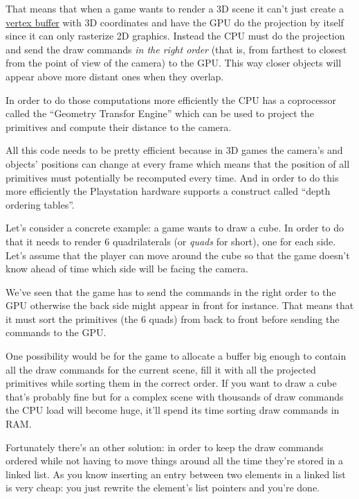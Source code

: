 \documentclass[a4paper]{article}
\begin{document}
That means that when a game wants to render a 3D scene it can't just
create a
\href{https://en.wikipedia.org/wiki/Vertex_Buffer_Object}{vertex
  buffer} with 3D coordinates and have the GPU do the projection by
itself since it can only rasterize 2D graphics. Instead the CPU must
do the projection and send the draw commands \emph{in the right order}
(that is, from farthest to closest from the point of view of the
camera) to the GPU. This way closer objects will appear above more
distant ones when they overlap.

In order to do those computations more efficiently the CPU has a
coprocessor called the ``Geometry Transfor Engine'' which can be used
to project the primitives and compute their distance to the camera.

All this code needs to be pretty efficient because in 3D games the
camera's and objects' positions can change at every frame which means
that the position of all primitives must potentially be recomputed
every time. And in order to do this more efficiently the Playstation
hardware supports a construct called ``depth ordering tables''.

Let's consider a concrete example: a game wants to draw a cube. In
order to do that it needs to render 6 quadrilaterals (or \emph{quads}
for short), one for each side. Let's assume that the player can move
around the cube so that the game doesn't know ahead of time which side
will be facing the camera.

We've seen that the game has to send the commands in the right order
to the GPU otherwise the back side might appear in front for
instance. That means that it must sort the primitives (the 6 quads)
from back to front before sending the commands to the GPU.

One possibility would be for the game to allocate a buffer big enough
to contain all the draw commands for the current scene, fill it with
all the projected primitives while sorting them in the correct
order. If you want to draw a cube that's probably fine but for a
complex scene with thousands of draw commands the CPU load will become
huge, it'll spend its time sorting draw commands in RAM.

Fortunately there's an other solution: in order to keep the draw
commands ordered while not having to move things around all the time
they're stored in a linked list. As you know inserting an entry
between two elements in a linked list is very cheap: you just rewrite
the element's list pointers and you're done.
\end{document}
